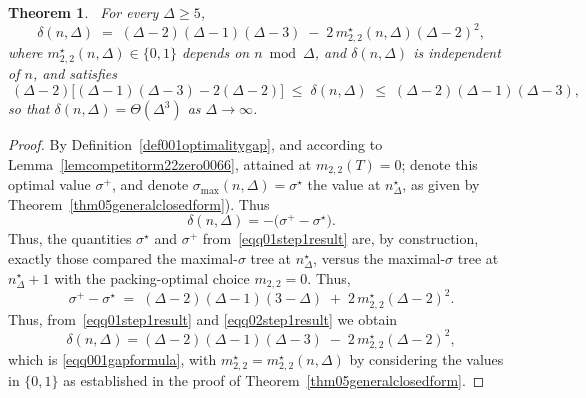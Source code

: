 \documentclass[12pt]{amsart}
\newtheorem{theorem}{Theorem}[section]
\begin{document}
\begin{theorem}~\label{thm08gapbounded}
For every $\Delta\geqslant 5$,
\begin{equation}~\label{eqq001gapformula}
\delta(n,\Delta) \;=\; (\Delta-2)(\Delta-1)(\Delta-3) \;-\; 2\,m_{2,2}^\star(n,\Delta)(\Delta-2)^2,
\end{equation}
where $m_{2,2}^\star(n,\Delta)\in\{0,1\}$ depends on $n\bmod\Delta$, and  $\delta(n,\Delta)$ is
independent of $n$, and satisfies
\begin{equation}~\label{eqqgap001bounds}
(\Delta-2)\big[(\Delta-1)(\Delta-3)-2(\Delta-2)\big] \;\le\; \delta(n,\Delta) \;\le\; (\Delta-2)(\Delta-1)(\Delta-3),
\end{equation}
so that $\delta(n,\Delta) = \Theta(\Delta^3)$ as $\Delta\to\infty$.
\end{theorem}
\begin{proof}
By Definition~\ref{def001optimalitygap},
and according to Lemma~\ref{lemcompetitorm22zero0066}, attained at $m_{2,2}(T)=0$; denote this optimal
value $\sigma^{+}$, and denote $\sigma_{\max}(n,\Delta)=\sigma^\star$  the
value at $n_\Delta^\star$, as given by Theorem~\ref{thm05generalclosedform}).
Thus
\begin{equation}~\label{eqq01step1result}
\delta(n,\Delta)=-\big(\sigma^{+}-\sigma^\star\big).
\end{equation}
Thus, the quantities $\sigma^\star$ and $\sigma^{+}$ from~\eqref{eqq01step1result} are, by construction, exactly those compared the maximal-$\sigma$ tree at
$n_\Delta^\star$, versus the maximal-$\sigma$ tree at $n_\Delta^\star+1$ with
the packing-optimal choice $m_{2,2}=0$. Thus, 
\begin{equation}~\label{eqq02step1result}
\sigma^{+}-\sigma^\star \;=\; (\Delta-2)(\Delta-1)(3-\Delta) \;+\; 2\,m_{2,2}^\star(\Delta-2)^2.
\end{equation}
Thus, from~\eqref{eqq01step1result} and \eqref{eqq02step1result} we obtain 
\begin{equation}~\label{eqq03step1result}
\delta(n,\Delta)=(\Delta-2)(\Delta-1)(\Delta-3) \;-\; 2\,m_{2,2}^\star(\Delta-2)^2,
\end{equation}
which is \eqref{eqq001gapformula}, with $m_{2,2}^\star=m_{2,2}^\star(n,\Delta)$
by considering the values in $\{0,1\}$ as established
in the proof of Theorem~\ref{thm05generalclosedform}.


\end{proof}
\end{document}
